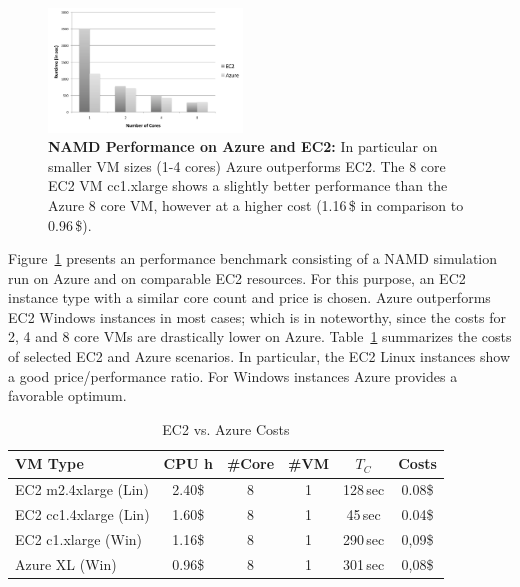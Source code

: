 \documentclass[conference,final]{IEEEtran}
\newcommand{\up}{\vspace*{-1em}}
\newcommand{\tc}{$T_{C}$ }
\begin{document}
\begin{figure}[htbp]
    \centering
        \includegraphics[width=0.46\textwidth]{performance/namd_ec2_azure.pdf}
    \caption{\textbf{NAMD Performance on Azure and EC2:} In particular on smaller VM sizes (1-4 cores) Azure 
    outperforms EC2. The 8 core EC2 VM cc1.xlarge shows a slightly better performance than the Azure 8 core VM,
    however at a higher cost (1.16\,\$ in comparison to 0.96\,\$).}
    \label{fig:performance_namd_ec2_azure}
    \up
\end{figure}

Figure~\ref{fig:performance_namd_ec2_azure} presents an performance 
benchmark consisting of a NAMD simulation run on Azure and on comparable 
EC2 resources. For this purpose, an EC2 instance type with a similar core
count and price is chosen. Azure outperforms EC2 Windows instances in 
most cases; which is in noteworthy, since the costs for 2, 4 and 8 core VMs are
drastically lower on Azure. Table~\ref{tbl:costs} summarizes the
costs of selected EC2 and Azure scenarios. In particular, the EC2
Linux instances show a good price/performance ratio. For Windows
instances Azure provides a favorable optimum.



\begin{table}[ht]
    \centering
	\begin{scriptsize}
		\begin{tabular}{|l|c|c|c|c|c|}
	        \hline
	        VM Type                 &CPU h  &\#Core &\#VM &\tc &Costs  \\ \hline
	        EC2 m2.4xlarge (Lin)  &2.40\$  &8          &1      &128\,sec     &0.08\$ \\ \hline
	        EC2 cc1.4xlarge (Lin) &1.60\$  &8          &1      &45\,sec     &0.04\$ \\ \hline
	        EC2 c1.xlarge   (Win)   &1.16\$  &8          &1      &290\,sec    &0,09\$ \\ \hline
	        Azure XL (Win)  &0.96\$ &8          &1      &301\,sec    &0,08\$ \\ \hline
		\end{tabular}
	\end{scriptsize}
	\caption{EC2 vs. Azure Costs\label{tbl:costs}}
	\up\up
\end{table}
\end{document}
